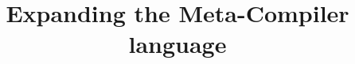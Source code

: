 


\begin{multicols}{3}
\title{Expanding the Meta-Compiler language}
\author{\writer}





\setcounter{tocdepth}{2}
\tableofcontents
\cleardoublepage
{}
\addtocounter{page}{4}



% 




\end{multicols}
